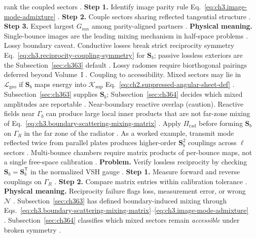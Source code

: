 rank the coupled sectors \cite{jackson1999}.
\textbf{Step 1.} Identify image parity rule Eq.~\eqref{eq:ch3.image-mode-admixture} \cite{jackson1999}.
\textbf{Step 2.} Couple sectors sharing reflected tangential structure \cite{stratton1941}.
\textbf{Step 3.} Expect largest \(G_{mn}\) among parity-aligned partners \cite{harrington2001}.
\textbf{Physical meaning.} Single-bounce images are the leading mixing mechanism in half-space problems \cite{stratton1941}.
Lossy boundary caveat. Conductive losses break strict reciprocity symmetry Eq.~\eqref{eq:ch3.reciprocity-coupling-symmetry} for \(\mathbf{S}_{b}\);
passive lossless exteriors are the Subsection~\ref{sec:ch363} default \cite{stratton1941}. Lossy radomes require
biorthogonal pairings deferred beyond Volume~I \cite{harrington2001}.
Coupling to accessibility. Mixed sectors may lie in \(\mathcal{L}_{\mathrm{geo}}\) if \(\mathbf{S}_{b}\) maps energy into
\(\mathcal{K}_{\mathrm{sup}}\) Eq.~\eqref{eq:ch2.suppressed-angular-sheet-def} \cite{stratton1941}.
Subsection~\ref{sec:ch363} supplies \(\mathbf{S}_{b}\); Subsection~\ref{sec:ch364} decides which mixed amplitudes are
reportable \cite{harrington2001}.
Near-boundary reactive overlap (caution). Reactive fields near \(\Gamma_{b}\) can produce large local inner products that are not far-zone mixing of
Eq.~\eqref{eq:ch3.boundary-scattering-mixing-matrix} \cite{harrington2001}. Apply \(\Pi_{\mathrm{rad}}\) before
forming \(\mathbf{S}_{b}\) on \(\Gamma_R\) in the far zone of the radiator \cite{hansen1988}.
As a worked example, transmit mode reflected twice from parallel plates produces higher-order \(\mathbf{S}_{b}^{2}\) couplings across \(\ell\)
sectors \cite{harrington2001}. Multi-bounce chambers require matrix products of per-bounce maps, not a single
free-space calibration \cite{hansen1988}.
\textbf{Problem.} Verify lossless reciprocity by checking \(\mathbf{S}_{b}=\mathbf{S}_{b}^{\mathsf{T}}\) in the normalized
VSH gauge \cite{stratton1941}.
\textbf{Step 1.} Measure forward and reverse couplings on \(\Gamma_R\) \cite{poynting1884}.
\textbf{Step 2.} Compare matrix entries within calibration tolerance \cite{harrington2001}.
\textbf{Physical meaning.} Reciprocity failure flags loss, measurement error, or wrong \(\mathcal{N}\) \cite{stratton1941}.
Subsection~\ref{sec:ch363} has defined boundary-induced mixing through
Eqs.~\eqref{eq:ch3.boundary-scattering-mixing-matrix}--\eqref{eq:ch3.image-mode-admixture}
\cite{stratton1941}. Subsection~\ref{sec:ch364} classifies which mixed sectors remain
\emph{accessible} under broken symmetry \cite{harrington2001}.
